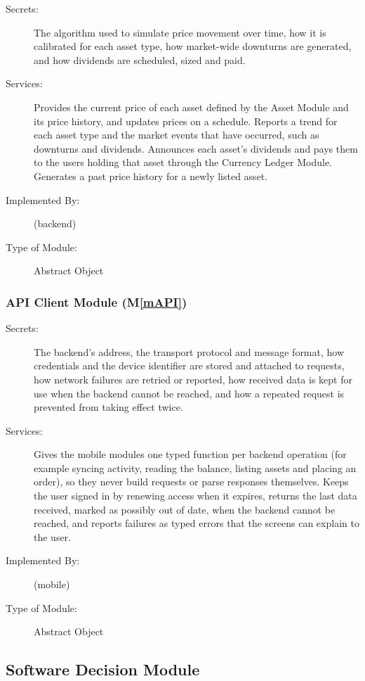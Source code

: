 \documentclass[12pt, titlepage]{article}
\newcommand{\mref}[1]{M\ref{#1}}
\begin{document}
\begin{description}
\item[Secrets:] The algorithm used to simulate price movement over time, how
  it is calibrated for each asset type, how market-wide downturns are
  generated, and how dividends are scheduled, sized and paid.
\item[Services:] Provides the current price of each asset defined by the Asset
  Module and its price history, and updates prices on a schedule. Reports a
  trend for each asset type and the market events that have occurred, such as
  downturns and dividends. Announces each asset's dividends and pays them to
  the users holding that asset through the Currency Ledger Module. Generates a
  past price history for a newly listed asset.
\item[Implemented By:] \progname{} (backend)
\item[Type of Module:] Abstract Object
\end{description}

\subsubsection{API Client Module (\mref{mAPI})}

\begin{description}
\item[Secrets:] The backend's address, the transport protocol and message
  format, how credentials and the device identifier are stored and attached
  to requests, how network failures are retried or reported, how received
  data is kept for use when the backend cannot be reached, and how a repeated
  request is prevented from taking effect twice.
\item[Services:] Gives the mobile modules one typed function per backend
  operation (for example syncing activity, reading the balance, listing assets
  and placing an order), so they never build requests or parse responses
  themselves. Keeps the user signed in by renewing access when it expires,
  returns the last data received, marked as possibly out of date, when the
  backend cannot be reached, and reports failures as typed errors that the
  screens can explain to the user.
\item[Implemented By:] \progname{} (mobile)
\item[Type of Module:] Abstract Object
\end{description}

\subsection{Software Decision Module}
\end{document}
